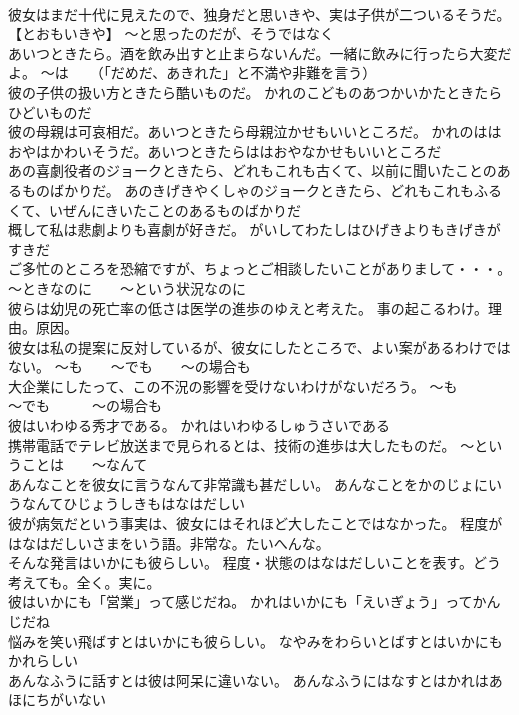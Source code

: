 \documentclass[8pt]{extreport}
\begin{document}
\begin{CJK}{UTF8}{min}
\\	彼女はまだ十代に見えたので、独身だと思いきや、実は子供が二ついるそうだ。	【とおもいきや】 ～と思ったのだが、そうではなく
\\	あいつときたら。酒を飲み出すと止まらないんだ。一緒に飲みに行ったら大変だよ。	～は　　（「だめだ、あきれた」と不満や非難を言う）
\\	彼の子供の扱い方ときたら酷いものだ。	かれのこどものあつかいかたときたらひどいものだ 
\\	彼の母親は可哀相だ。あいつときたら母親泣かせもいいところだ。	かれのははおやはかわいそうだ。あいつときたらははおやなかせもいいところだ 
\\	あの喜劇役者のジョークときたら、どれもこれも古くて、以前に聞いたことのあるものばかりだ。	あのきげきやくしゃのジョークときたら、どれもこれもふるくて、いぜんにきいたことのあるものばかりだ 
\\	概して私は悲劇よりも喜劇が好きだ。	がいしてわたしはひげきよりもきげきがすきだ 
\\	ご多忙のところを恐縮ですが、ちょっとご相談したいことがありまして・・・。	～ときなのに　　～という状況なのに
\\	彼らは幼児の死亡率の低さは医学の進歩のゆえと考えた。	事の起こるわけ。理由。原因。
\\	彼女は私の提案に反対しているが、彼女にしたところで、よい案があるわけではない。	～も　　～でも　　～の場合も
\\	大企業にしたって、この不況の影響を受けないわけがないだろう。	～も　　　～でも　　　～の場合も
\\	彼はいわゆる秀才である。	かれはいわゆるしゅうさいである 
\\	携帯電話でテレビ放送まで見られるとは、技術の進歩は大したものだ。	～ということは　　～なんて
\\	あんなことを彼女に言うなんて非常識も甚だしい。	あんなことをかのじょにいうなんてひじょうしきもはなはだしい 
\\	彼が病気だという事実は、彼女にはそれほど大したことではなかった。	程度がはなはだしいさまをいう語。非常な。たいへんな。
\\	そんな発言はいかにも彼らしい。	程度・状態のはなはだしいことを表す。どう考えても。全く。実に。
\\	彼はいかにも「営業」って感じだね。	かれはいかにも「えいぎょう」ってかんじだね 
\\	悩みを笑い飛ばすとはいかにも彼らしい。	なやみをわらいとばすとはいかにもかれらしい 
\\	あんなふうに話すとは彼は阿呆に違いない。	あんなふうにはなすとはかれはあほにちがいない 

\end{CJK}
\end{document}
